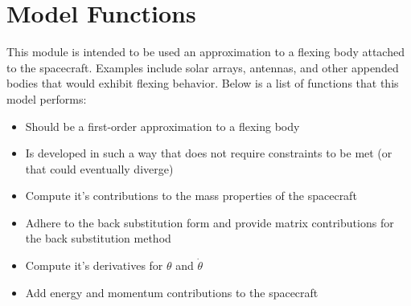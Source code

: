 \section{Model Functions}

This module is intended to be used an approximation to a flexing body attached to the spacecraft. Examples include solar arrays, antennas, and other appended bodies that would exhibit flexing behavior. Below is a list of functions that this model performs:

\begin{itemize}
	\item Should be a first-order approximation to a flexing body
	\item Is developed in such a way that does not require constraints to be met (or that could eventually diverge)
	\item Compute it's contributions to the mass properties of the spacecraft
	\item Adhere to the back substitution form and provide matrix contributions for the back substitution method
	\item Compute it's derivatives for $\theta$ and $\dot{\theta}$
	\item Add energy and momentum contributions to the spacecraft
\end{itemize}